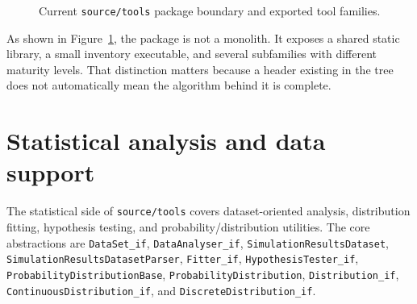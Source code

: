 \begin{figure}[htbp]
\centering
{}
\caption{Current \texttt{source/tools} package boundary and exported tool families.}
\label{fig:tools-package-map}
\end{figure}

As shown in Figure~\ref{fig:tools-package-map}, the package is not a monolith. It exposes a shared static library, a small inventory executable, and several subfamilies with different maturity levels. That distinction matters because a header existing in the tree does not automatically mean the algorithm behind it is complete.

\section{Statistical analysis and data support}
\label{sec:tools-statistical-analysis}

The statistical side of \texttt{source/tools} covers dataset-oriented analysis, distribution fitting, hypothesis testing, and probability/distribution utilities. The core abstractions are \texttt{DataSet\_if}, \texttt{DataAnalyser\_if}, \texttt{SimulationResultsDataset}, \texttt{SimulationResultsDatasetParser}, \texttt{Fitter\_if}, \texttt{HypothesisTester\_if}, \texttt{ProbabilityDistributionBase}, \texttt{ProbabilityDistribution}, \texttt{Distribution\_if}, \texttt{ContinuousDistribution\_if}, and \texttt{DiscreteDistribution\_if}.

